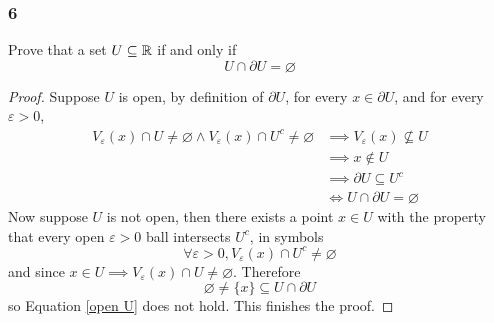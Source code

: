 \documentclass[../main.tex]{subfiles}
\begin{document}
\subsubsection*{6}
\begin{wts}
    Prove that a set $U\subseteq\mathbb{R}$ if and only if
    \begin{equation}\label{open U}
        U\cap\partial U=\varnothing
    \end{equation}
\end{wts}
\begin{proof}
    Suppose $U$ is open, by definition of $\partial U$, for every $x\in\partial U$, and for every $\varepsilon>0$,
    \begin{align*}
        V_\varepsilon(x)\cap U\neq \varnothing\wedge V_\varepsilon(x)\cap U^c\neq\varnothing&\implies V_\varepsilon(x)\not\subseteq U\\
        &\implies x\notin U\\
        &\implies \partial U\subseteq U^c\\
        &\iff U\cap\partial U =\varnothing
    \end{align*}
    Now suppose $U$ is not open, then there exists a point $x\in U$ with the property that every open $\varepsilon>0$ ball intersects $U^c$, in symbols
    \[\forall\varepsilon>0, V_\varepsilon(x)\cap U^c\neq\varnothing\]
    and since $x\in U\implies V_\varepsilon(x)\cap U\neq\varnothing$. Therefore
    \[\varnothing\neq\{x\}\subseteq U\cap\partial U\]
    so Equation \eqref{open U} does not hold. This finishes the proof.
\end{proof}
\end{document}

